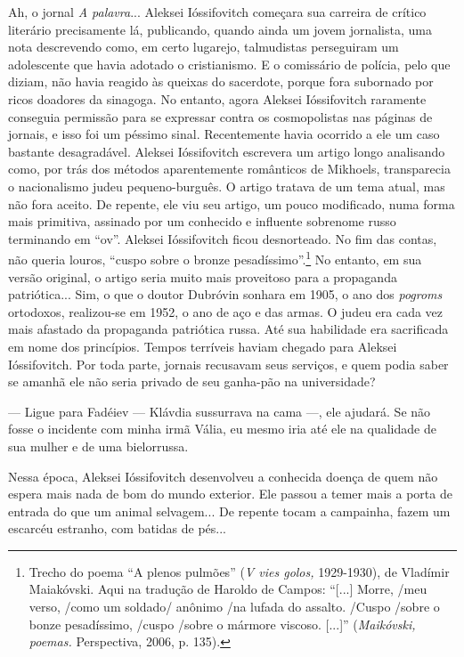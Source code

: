 Ah, o jornal \emph{A palavra}... Aleksei Ióssifovitch começara sua
carreira de crítico literário precisamente lá, publicando, quando ainda
um jovem jornalista, uma nota descrevendo como, em certo lugarejo,
talmudistas perseguiram um adolescente que havia adotado o cristianismo.
E o comissário de polícia, pelo que diziam, não havia reagido às queixas
do sacerdote, porque fora subornado por ricos doadores da sinagoga. No
entanto, agora Aleksei Ióssifovitch raramente conseguia permissão para
se expressar contra os cosmopolistas nas páginas de jornais, e isso foi
um péssimo sinal. Recentemente havia ocorrido a ele um caso bastante
desagradável. Aleksei Ióssifovitch escrevera um artigo longo analisando
como, por trás dos métodos aparentemente românticos de Mikhoels,
transparecia o nacionalismo judeu pequeno-burguês. O artigo tratava de
um tema atual, mas não fora aceito. De repente, ele viu seu artigo, um
pouco modificado, numa forma mais primitiva, assinado por um conhecido e
influente sobrenome russo terminando em ``ov''. Aleksei Ióssifovitch
ficou desnorteado. No fim das contas, não queria louros, ``cuspo sobre o
bronze pesadíssimo''.\footnote{Trecho do poema ``A plenos pulmões''
  (\emph{V vies golos,} 1929-1930), de Vladímir Maiakóvski. Aqui na
  tradução de Haroldo de Campos: ``{[}...{]} Morre, /meu verso, /como um
  soldado/ anônimo /na lufada do assalto. /Cuspo /sobre o bonze
  pesadíssimo, /cuspo /sobre o mármore viscoso. {[}...{]}''
  (\emph{Maikóvski, poemas.} Perspectiva, 2006, p. 135).} No entanto, em
sua versão original, o artigo seria muito mais proveitoso para a
propaganda patriótica... Sim, o que o doutor Dubróvin sonhara em 1905, o
ano dos \emph{pogroms} ortodoxos, realizou-se em 1952, o ano de aço e
das armas. O judeu era cada vez mais afastado da propaganda patriótica
russa. Até sua habilidade era sacrificada em nome dos princípios. Tempos
terríveis haviam chegado para Aleksei Ióssifovitch. Por toda parte,
jornais recusavam seus serviços, e quem podia saber se amanhã ele não
seria privado de seu ganha-pão na universidade?

--- Ligue para Fadéiev --- Klávdia sussurrava na cama ---, ele ajudará.
Se não fosse o incidente com minha irmã Vália, eu mesmo iria até ele na
qualidade de sua mulher e de uma bielorrussa.

Nessa época, Aleksei Ióssifovitch desenvolveu a conhecida doença de quem
não espera mais nada de bom do mundo exterior. Ele passou a temer mais a
porta de entrada do que um animal selvagem... De repente tocam a
campainha, fazem um escarcéu estranho, com batidas de pés...

